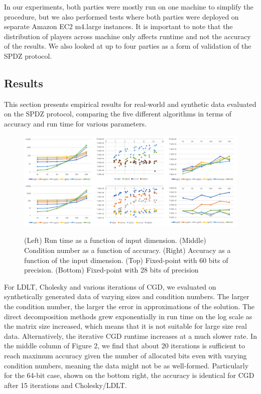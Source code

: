 \documentclass{article}
\begin{document}
In our experiments, both parties were mostly run on one machine to simplify the procedure, but we also performed tests where both parties were deployed on separate Amazon EC2 m4.large instances. It is important to note that the distribution of players across machine only affects runtime and not the accuracy of the results. We also looked at up to four parties as a form of validation of the SPDZ protocol.

\subsection{Results}

This section presents empirical results for real-world and synthetic data evaluated on the SPDZ protocol, comparing the five different algorithms in terms of accuracy and run time for various parameters. 

\begin{figure}[h!]
\centering
  \includegraphics[scale=0.4]{allregression.png}
  \label{fig:result4}
    \caption{(Left) Run time as a function of input dimension. (Middle) Condition number as a function of accuracy. (Right) Accuracy as a function of the input dimension. (Top) Fixed-point with 60 bits of precision. (Bottom) Fixed-point with 28 bits of precision}
\end{figure}

For LDLT, Cholesky and various iterations of CGD, we evaluated on synthetically generated data of varying sizes and condition numbers. The larger the condition number, the larger the error in approximations of the solution. The direct decomposition methods grew exponentially in run time on the log scale as the matrix size increased, which means that it is not suitable for large size real data. Alternatively, the iterative CGD runtime increases at a much slower rate. In the middle column of Figure 2, we find that about 20 iterations is sufficient to reach maximum accuracy given the number of allocated bits even with varying condition numbers, meaning the data might not be as well-formed. Particularly for the 64-bit case, shown on the bottom right, the accuracy is identical for CGD after 15 iterations and Cholesky/LDLT.
\end{document}
